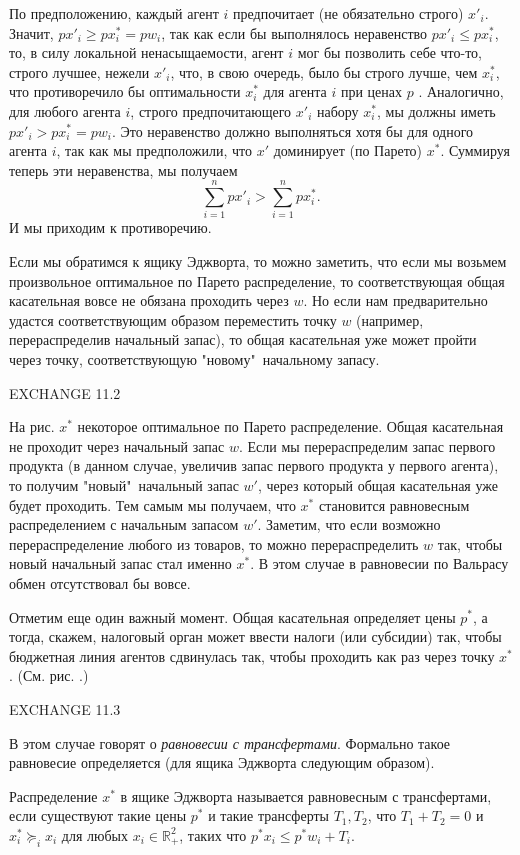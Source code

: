 По предположению, каждый агент $i$ предпочитает (не обязательно строго) $x'_i$.
Значит, $px'_i \geq px^*_i= pw_i$, так как если бы выполнялось неравенство
$px'_i \le px^*_i$, то, в силу локальной ненасыщаемости, агент $i$ мог бы
позволить себе что-то, строго лучшее, нежели $x'_i$, что, в свою
очередь, было бы строго лучше, чем $x^*_i$, что противоречило бы
оптимальности $x^*_i$ для агента $i$ при ценах $p$ .
Аналогично, для любого агента $i$, строго предпочитающего $x'_i$ набору
$x^*_i$, мы должны иметь $px'_i>px^*_i=pw_i$. Это неравенство должно
выполняться хотя бы для одного агента $i$, так как мы предположили, что
$x'$ доминирует (по Парето) $x^*$. Суммируя теперь эти неравенства, мы получаем
$$ \sum^n_{i=1}px'_i>\sum^n_{i=1}px^*_i.$$
И мы приходим к противоречию.

Если мы обратимся к ящику Эджворта, то можно заметить, что если мы возьмем
произвольное оптимальное по Парето распределение, то соответствующая
общая касательная вовсе не обязана проходить через $w$. Но если нам предварительно
удастся соответствующим образом переместить точку $w$ (например, перераспределив
начальный запас), то общая касательная
уже может пройти через точку, соответствующую "новому"\, начальному запасу.

EXCHANGE 11.2

На рис.   $x^*$ некоторое оптимальное по Парето распределение. Общая касательная
не проходит через начальный запас $w$. Если мы перераспределим запас первого продукта
(в данном случае, увеличив запас первого продукта у первого агента), то получим "новый"\,
начальный запас $w'$, через который общая касательная уже будет проходить. Тем самым
мы получаем, что $x^*$ становится равновесным распределением с начальным запасом $w'$.
Заметим, что если возможно перераспределение любого из товаров, то можно перераспределить
$w$ так, чтобы новый начальный запас стал именно $x^*$. В этом случае в равновесии
по Вальрасу обмен отсутствовал бы вовсе.

Отметим еще один важный момент. Общая касательная определяет
цены $p^*$, а тогда, скажем, налоговый орган может ввести налоги (или субсидии)
так, чтобы бюджетная линия агентов сдвинулась так, чтобы проходить как раз
через точку $x^*$. (См. рис.    .)

EXCHANGE 11.3

В этом случае говорят о \emph{равновесии с трансфертами}. Формально такое равновесие
определяется (для ящика Эджворта следующим образом).

Распределение $x^*$ в ящике Эджворта называется равновесным с
трансфертами, если существуют такие цены $p^*$ и такие трансферты
$T_1, T_2$, что $T_1+T_2=0$ и $x^*_i\succeq_ix_i$ для любых
$x_i \in \mathbb{R}^2_+$, таких что $p^*x_i\leq p^*w_i+T_i$.

